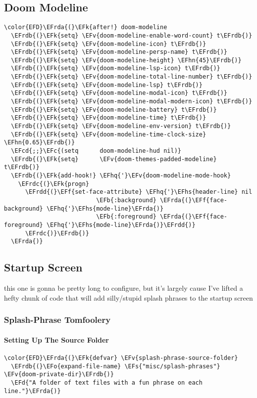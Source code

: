 \documentclass{article}
\newcommand{\EFc}[1]{\textcolor{EFc}{#1}} %
\newcommand{\EFcd}[1]{\textcolor{EFcd}{#1}} %
\newcommand{\EFs}[1]{\textcolor{EFs}{#1}} %
\newcommand{\EFd}[1]{\textcolor{EFd}{#1}} %
\newcommand{\EFk}[1]{\textcolor{EFk}{#1}} %
\newcommand{\EFb}[1]{\textcolor{EFb}{#1}} %
\newcommand{\EFf}[1]{\textcolor{EFf}{#1}} %
\newcommand{\EFv}[1]{\textcolor{EFv}{#1}} %
\newcommand{\EFo}[1]{\textcolor{EFo}{#1}} %
\newcommand{\EFhn}[1]{\textcolor{EFhn}{\textbf{#1}}} %
\newcommand{\EFhq}[1]{#1} %
\newcommand{\EFhs}[1]{\textcolor{EFhs}{#1}} %
\newcommand{\EFrda}[1]{\textcolor{EFrda}{#1}} %
\newcommand{\EFrdb}[1]{\textcolor{EFrdb}{#1}} %
\newcommand{\EFrdc}[1]{\textcolor{EFrdc}{#1}} %
\newcommand{\EFrdd}[1]{\textcolor{EFrdd}{#1}} %
\begin{document}
\subsection{Doom Modeline}
\label{sec:orgcf52096}
\begin{Code}
\begin{Verbatim}
\color{EFD}\EFrda{(}\EFk{after!} doom-modeline
  \EFrdb{(}\EFk{setq} \EFv{doom-modeline-enable-word-count} t\EFrdb{)}
  \EFrdb{(}\EFk{setq} \EFv{doom-modeline-icon} t\EFrdb{)}
  \EFrdb{(}\EFk{setq} \EFv{doom-modeline-persp-name} t\EFrdb{)}
  \EFrdb{(}\EFk{setq} \EFv{doom-modeline-height} \EFhn{45}\EFrdb{)}
  \EFrdb{(}\EFk{setq} \EFv{doom-modeline-lsp-icon} t\EFrdb{)}
  \EFrdb{(}\EFk{setq} \EFv{doom-modeline-total-line-number} t\EFrdb{)}
  \EFrdb{(}\EFk{setq} \EFv{doom-modeline-lsp} t\EFrdb{)}
  \EFrdb{(}\EFk{setq} \EFv{doom-modeline-modal-icon} t\EFrdb{)}
  \EFrdb{(}\EFk{setq} \EFv{doom-modeline-modal-modern-icon} t\EFrdb{)}
  \EFrdb{(}\EFk{setq} \EFv{doom-modeline-battery} t\EFrdb{)}
  \EFrdb{(}\EFk{setq} \EFv{doom-modeline-time} t\EFrdb{)}
  \EFrdb{(}\EFk{setq} \EFv{doom-modeline-env-version} t\EFrdb{)}
  \EFrdb{(}\EFk{setq} \EFv{doom-modeline-time-clock-size} \EFhn{0.65}\EFrdb{)}
  \EFcd{;;}\EFc{(setq      doom-modeline-hud nil)}
  \EFrdb{(}\EFk{setq}      \EFv{doom-themes-padded-modeline} t\EFrdb{)}
  \EFrdb{(}\EFk{add-hook!} \EFhq{'}\EFv{doom-modeline-mode-hook}
    \EFrdc{(}\EFk{progn}
      \EFrdd{(}\EFf{set-face-attribute} \EFhq{'}\EFhs{header-line} nil
                          \EFb{:background} \EFrda{(}\EFf{face-background} \EFhq{'}\EFhs{mode-line}\EFrda{)}
                          \EFb{:foreground} \EFrda{(}\EFf{face-foreground} \EFhq{'}\EFhs{mode-line}\EFrda{)}\EFrdd{)}
      \EFrdc{)}\EFrdb{)}
  \EFrda{)}
\end{Verbatim}
\end{Code}

\subsection{Startup Screen}
\label{sec:org5220564}
this one is gonna be pretty long to configure, but it's largely cause I've lifted a hefty chunk of code that will add silly/stupid splash phrases to the startup screen
\subsubsection{Splash-Phrase Tomfoolery}
\label{sec:org402783b}
\paragraph{Setting Up The Source Folder}
\label{sec:org6657537}
\begin{Code}
\begin{Verbatim}
\color{EFD}\EFrda{(}\EFk{defvar} \EFv{splash-phrase-source-folder}
  \EFrdb{(}\EFo{expand-file-name} \EFs{"misc/splash-phrases"} \EFv{doom-private-dir}\EFrdb{)}
  \EFd{"A folder of text files with a fun phrase on each line."}\EFrda{)}
\end{Verbatim}
\end{Code}
\end{document}
